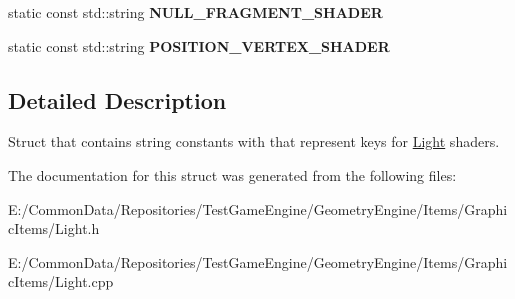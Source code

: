 \begin{DoxyCompactItemize}
\item 
\mbox{\label{struct_geometry_engine_1_1_geometry_world_item_1_1_geometry_light_1_1_light_shader_constants_af29588c31d1aaa409253d656bf6214ad}} 
static const std\+::string {\bfseries N\+U\+L\+L\+\_\+\+F\+R\+A\+G\+M\+E\+N\+T\+\_\+\+S\+H\+A\+D\+ER}
\item 
\mbox{\label{struct_geometry_engine_1_1_geometry_world_item_1_1_geometry_light_1_1_light_shader_constants_a4a7481727e093c9bde8a8e880f4b8274}} 
static const std\+::string {\bfseries P\+O\+S\+I\+T\+I\+O\+N\+\_\+\+V\+E\+R\+T\+E\+X\+\_\+\+S\+H\+A\+D\+ER}
\end{DoxyCompactItemize}


\subsection{Detailed Description}
Struct that contains string constants with that represent keys for \mbox{\hyperlink{class_geometry_engine_1_1_geometry_world_item_1_1_geometry_light_1_1_light}{Light}} shaders. 

The documentation for this struct was generated from the following files\+:\begin{DoxyCompactItemize}
\item 
E\+:/\+Common\+Data/\+Repositories/\+Test\+Game\+Engine/\+Geometry\+Engine/\+Items/\+Graphic\+Items/Light.\+h\item 
E\+:/\+Common\+Data/\+Repositories/\+Test\+Game\+Engine/\+Geometry\+Engine/\+Items/\+Graphic\+Items/Light.\+cpp\end{DoxyCompactItemize}
